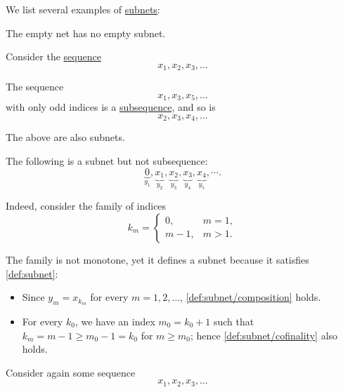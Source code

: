 \begin{example}\label{ex:def:subnet}
  We list several examples of \hyperref[def:subnet]{subnets}:
  \begin{thmenum}
     The empty net has no empty subnet.

     Consider the \hyperref[def:sequence]{sequence}
    \begin{equation*}
      x_1, x_2, x_3, \ldots
    \end{equation*}

    The sequence
    \begin{equation*}
      x_1, x_3, x_5, \ldots
    \end{equation*}
    with only odd indices is a \hyperref[def:subsequence]{subsequence}, and so is
    \begin{equation*}
      x_2, x_3, x_4, \ldots
    \end{equation*}

    The above are also subnets.

     The following is a subnet but not subsequence:
    \begin{equation*}
      \underbrace{0}_{y_1}, \underbrace{x_1}_{y_2}, \underbrace{x_2}_{y_3}, \underbrace{x_3}_{y_4}, \underbrace{x_4}_{y_5}, \cdots.
    \end{equation*}

    Indeed, consider the family of indices
    \begin{equation*}
      k_m = \begin{cases}
        0,     &m = 1, \\
        m - 1, &m > 1.
      \end{cases}
    \end{equation*}

    The family is not monotone, yet it defines a subnet because it satisfies \cref{def:subnet}:
    \begin{itemize}
      \item Since \( y_m = x_{k_m} \) for every \( m = 1, 2, \ldots \), \ref{def:subnet/composition} holds.
      \item For every \( k_0 \), we have an index \( m_0 = k_0 + 1 \) such that \( k_m = m - 1 \geq m_0 - 1 = k_0 \) for \( m \geq m_0 \); hence \ref{def:subnet/cofinality} also holds.
    \end{itemize}

     Consider again some sequence
    \begin{equation*}
      x_1, x_2, x_3, \ldots
    \end{equation*}


\end{thmenum}
\end{example}
